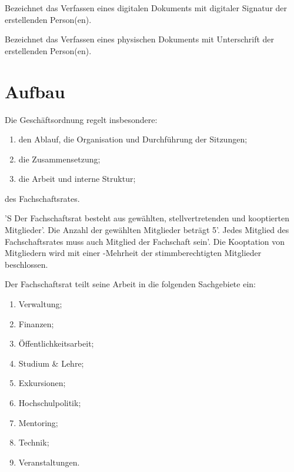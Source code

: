 \documentclass[%
    parskip=half,
]{scrartcl}
\begin{document}

Bezeichnet das Verfassen eines digitalen Dokuments mit digitaler Signatur der erstellenden Person(en).


Bezeichnet das Verfassen eines physischen Dokuments mit Unterschrift der erstellenden Person(en).

\clearpage

\appendix

\section{Aufbau}

\begin{contract}


Die Geschäftsordnung regelt insbesondere:
\begin{enumerate}[\qquad a)]
    \item den Ablauf, die Organisation und Durchführung der Sitzungen;
    \item die Zusammensetzung;
    \item die Arbeit und interne Struktur;
\end{enumerate}
des Fachschaftsrates.


'S Der Fachschaftsrat besteht aus gewählten, stellvertretenden und kooptierten Mitglieder'.
Die Anzahl der gewählten Mitglieder beträgt 5'.
Jedes Mitglied des Fachschaftsrates muss auch Mitglied der Fachschaft sein'.
Die Kooptation von Mitgliedern wird mit einer -Mehrheit der stimmberechtigten Mitglieder beschlossen.

Der Fachschaftsrat teilt seine Arbeit in die folgenden Sachgebiete ein:
\begin{enumerate}[\qquad a)]
    \item Verwaltung;
    \item Finanzen;
    \item Öffentlichkeitsarbeit;
    \item Studium \& Lehre;
    \item Exkursionen;
    \item Hochschulpolitik;
    \item Mentoring;
    \item Technik;
    \item Veranstaltungen.
\end{enumerate}


\end{contract}
\end{document}
